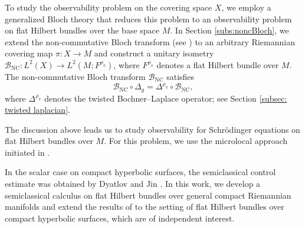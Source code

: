 \documentclass[11pt,oneside,reqno]{amsart}
\theoremstyle{definition}
\newtheorem{remark}[definition]{Remark}
\numberwithin{equation}{section}
\theoremstyle{plain}
\begin{document}
To study the observability problem on the covering space $X$, we employ a generalized Bloch theory that reduces this problem to an observability problem on flat Hilbert bundles over the base space $M$. In Section \ref{subs:noncBloch}, we extend the non-commutative Bloch transform (see \cite[(5.1)]{nagy2024hyperbolic}) to an arbitrary Riemannian covering map $\pi: X\to M$ and construct a unitary isometry $\mathcal{B}_{\mathrm{NC}}: L^2(X)\rightarrow L^2(M;F^{\rho_{\pi}})$, where $F^{\rho_{\pi}}$ denotes a flat Hilbert bundle over $M$. The non-commutative Bloch transform $\mathcal{B}_{\mathrm{NC}}$ satisfies 
\begin{equation*}
    \mathcal{B}_{\mathrm{NC}}\circ \Delta_g=\Delta^{\rho_{\pi}}\circ \mathcal{B}_{\mathrm{NC}},
\end{equation*}
where $\Delta^{\rho_{\pi}}$ denotes the twisted Bochner–Laplace operator; see Section \ref{subsec: twisted laplacian}.

The discussion above leads us to study observability for Schrödinger equations on flat Hilbert bundles over $M$. For this problem, we use the microlocal approach initiated in \cite{ralston1969solutions, rauch1974exponetial, bardo1992, Burq1997control}. 

In the scalar case on compact hyperbolic surfaces, the semiclassical control estimate was obtained by Dyatlov and Jin \cite{dyatlov2018semiclassical}. In this work, we develop a semiclassical calculus on flat Hilbert bundles over general compact Riemannian manifolds and extend the results of \cite{dyatlov2018semiclassical} to the setting of flat Hilbert bundles over compact hyperbolic surfaces, which are of independent interest.








\end{document}
